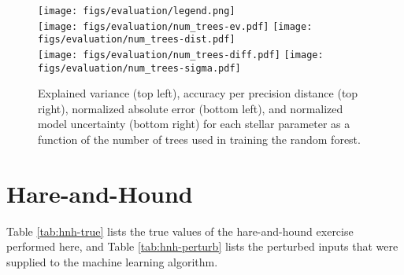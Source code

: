 \documentclass[twocolumn,twocolappendix]{aastex6}
\begin{document}
\begin{figure*}
    \centering
    \texttt{[image: figs/evaluation/legend.png]}\\
    \texttt{[image: figs/evaluation/num\_trees-ev.pdf]}%
    \texttt{[image: figs/evaluation/num\_trees-dist.pdf]}\\
    \texttt{[image: figs/evaluation/num\_trees-diff.pdf]}%
    \texttt{[image: figs/evaluation/num\_trees-sigma.pdf]}\\
    \caption{Explained variance (top left), accuracy per precision distance (top right), normalized absolute error (bottom left), and normalized model uncertainty (bottom right) for each stellar parameter as a function of the number of trees used in training the random forest. 
    \label{fig:app-evaluation-trees}} 
\end{figure*}


\section{Hare-and-Hound}
\label{sec:hare-and-hound}
Table \ref{tab:hnh-true} lists the true values of the hare-and-hound exercise performed here, and Table \ref{tab:hnh-perturb} lists the perturbed inputs that were supplied to the machine learning algorithm. 
\end{document}
